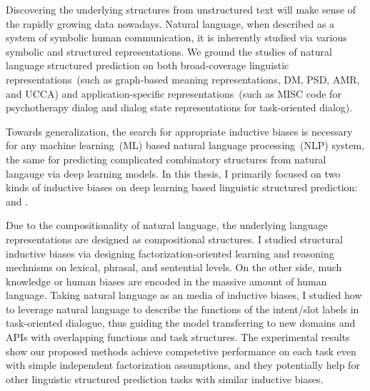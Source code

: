Discovering the underlying structures from unstructured text will make
sense of the rapidly growing data nowadays. Natural language, when
described as a system of symbolic human communication, it is
inherently studied via various symbolic and structured
representations. We ground the studies of natural language structured
prediction on both broad-coverage linguistic representations~(such as
graph-based meaning representations, DM, PSD, AMR, and UCCA) and
application-specific representations~(such as MISC code for
psychotherapy dialog and dialog state representations for
task-oriented dialog).

Towards generalization, the search for appropriate inductive biases is
necessary for any machine learning~(ML) based natural language
processing~(NLP) system, the same for predicting complicated
combinatory structures from natural langauge via deep learning
models. In this thesis, I primarily focused on two kinds of inductive
biases on deep learning based linguistic structured prediction:
 and .

Due to the compositionality of natural language, the underlying
language representations are designed as compositional structures. I
studied structural inductive biases via designing
factorization-oriented learning and reasoning mechnisms on lexical,
phrasal, and sentential levels. On the other side, much knowledge or
human biases are encoded in the massive amount of human
language. Taking natural language as an media of inductive biases, I
studied how to leverage natural language to describe the functions of
the intent/slot labels in task-oriented dialogue, thus guiding the
model transferring to new domains and APIs with overlapping functions
and task structures.  The experimental results show our proposed
methods achieve competetive performance on each task even with simple
independent factorization assumptions, and they potentially help for
other linguistic structured prediction tasks with similar inductive
biases.

